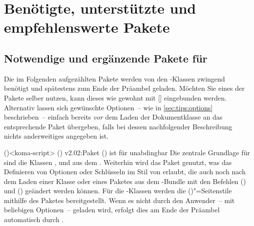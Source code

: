\chapter{%
  Benötigte, unterstützte und empfehlenswerte Pakete%
  \label{sec:packages}%
}
\section{%
  Notwendige und ergänzende Pakete für \TUDScript%
  \label{sec:packages:needed}%
}
Die im Folgenden aufgezählten Pakete werden von den \TUDScript-Klassen zwingend 
benötigt und spätestens zum Ende der Präambel geladen. Möchten Sie eines der 
Pakete selber nutzen, kann dieses wie gewohnt mit
[] eingebunden werden. 
Alternativ lassen sich gewünschte Optionen~-- wie in \autoref{sec:tips:options} 
beschrieben~-- einfach bereits \emph{vor} dem Laden der Dokumentklasse an das 
entsprechende Paket übergeben, falls bei dessen nachfolgender Beschreibung 
nichts anderweitiges angegeben ist.
%
\begin{Entity*}{}
\begin{packages}
\item[%
  typearea,scrbase,scrlayer-scrpage,scrletter,scrextend%
]()<koma-script>
  \ChangedAt(){%
    v2.02:Paket () ist für 
    \TUDScript unabdingbar%
  }%
  Die zentrale Grundlage für \TUDScript sind die Klassen , 
   und  aus dem . 
  Weiterhin wird das Paket  genutzt, was das Definieren von 
  Optionen oder Schlüsseln im Stil von \KOMAScript erlaubt, die auch noch nach 
  dem Laden einer Klasse oder eines Paketes aus dem \TUDScript-Bundle mit den 
  Befehlen () und () geändert werden können. 
  Für die \TUDScript-Klassen werden die ()"=Seitenstile 
  mithilfe des Paketes  bereitgestellt. Wenn es nicht 
  durch den Anwender~-- mit beliebigen Optionen~-- geladen wird, erfolgt dies 
  am Ende der Präambel automatisch durch \TUDScript.
\end{packages}
\end{Entity*}
